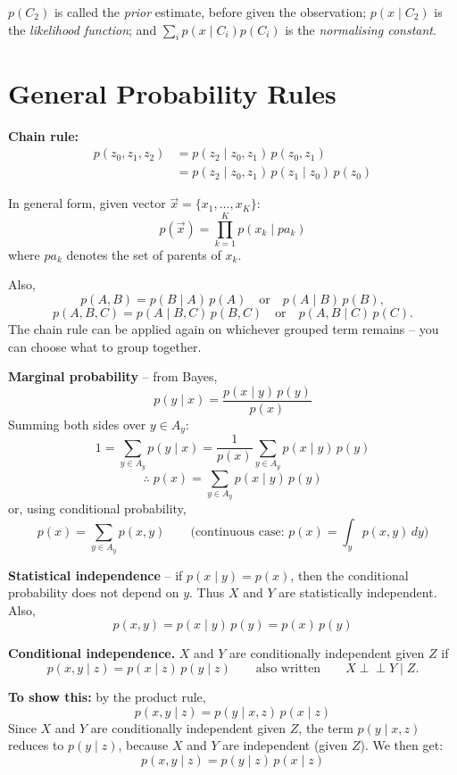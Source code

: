 \noindent
$p(C_2)$ is called the \emph{prior} estimate, before given the observation; $p(x\mid C_2)$ is the \emph{likelihood function}; and $\displaystyle\sum_i p(x\mid C_i)p(C_i)$ is the \emph{normalising constant}.

\section{General Probability Rules}
\label{prob:sec:general-rules}

\noindent
\textbf{Chain rule:}
\begin{align*}
p(z_0,z_1,z_2) &= p(z_2\mid z_0,z_1)\,p(z_0,z_1) \\
&= p(z_2\mid z_0,z_1)\,p(z_1\mid z_0)\,p(z_0)
\end{align*}

\noindent
In general form, given vector $\vec x = \{x_1,\dots,x_K\}$:
\[
p(\vec x) = \prod_{k=1}^{K} p(x_k \mid pa_k)
\]
where $pa_k$ denotes the set of parents of $x_k$.

\medskip
\noindent
Also,
\[
p(A,B) = p(B\mid A)\,p(A) \quad \text{or} \quad p(A\mid B)\,p(B),
\]
\[
p(A,B,C) = p(A\mid B,C)\,p(B,C) \quad \text{or} \quad p(A,B\mid C)\,p(C).
\]
The chain rule can be applied again on whichever grouped term remains -- you can choose what to group together.

\medskip
\noindent
\textbf{Marginal probability} -- from Bayes,
\[
p(y\mid x) = \frac{p(x\mid y)\,p(y)}{p(x)}
\]
Summing both sides over $y \in A_y$:
\[
1 = \sum_{y\in A_y} p(y\mid x) = \frac{1}{p(x)} \sum_{y\in A_y} p(x\mid y)\,p(y)
\]
\[
\therefore\; p(x) = \sum_{y\in A_y} p(x\mid y)\,p(y)
\]
\noindent
or, using conditional probability,
\[
p(x) = \sum_{y\in A_y} p(x,y)
\qquad \text{(continuous case: } p(x) = \int_y p(x,y)\,dy \text{)}
\]

\medskip
\noindent
\textbf{Statistical independence} -- if $p(x\mid y) = p(x)$, then the conditional probability does not depend on $y$. Thus $X$ and $Y$ are statistically independent. Also,
\[
p(x,y) = p(x\mid y)\,p(y) = p(x)\,p(y)
\]

\medskip
\noindent
\textbf{Conditional independence.} $X$ and $Y$ are conditionally independent given $Z$ if
\[
p(x,y\mid z) = p(x\mid z)\,p(y\mid z)
\qquad \text{also written} \qquad
X \perp\!\!\!\perp Y \mid Z.
\]

\noindent
\textbf{To show this:} by the product rule,
\[
p(x,y\mid z) = p(y\mid x,z)\,p(x\mid z)
\]
Since $X$ and $Y$ are conditionally independent given $Z$, the term $p(y\mid x,z)$ reduces to $p(y\mid z)$, because $X$ and $Y$ are independent (given $Z$). We then get:
\[
p(x,y\mid z) = p(y\mid z)\,p(x\mid z)
\]

